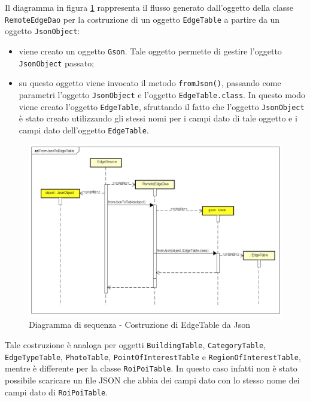 \documentclass[../DefinizioneDiProdotto.tex]{subfiles}
\begin{document}
		Il diagramma in figura \ref{fig:FromJsonToEdgeTable} rappresenta il flusso generato dall'oggetto della classe \verb|RemoteEdgeDao| per la costruzione di un oggetto \verb|EdgeTable| a partire da un oggetto \verb|JsonObject|:
		\begin{itemize}
			\item viene creato un oggetto \verb|Gson|. Tale oggetto permette di gestire l'oggetto \verb|JsonObject| passato;
			\item su questo oggetto viene invocato il metodo \verb|fromJson()|, passando come parametri l'oggetto \verb|JsonObject| e l'oggetto \verb|EdgeTable.class|. In questo modo viene creato l'oggetto \verb|EdgeTable|, sfruttando il fatto che l'oggetto \verb|JsonObject| è stato creato utilizzando gli stessi nomi per i campi dato di tale oggetto e i campi dato dell'oggetto \verb|EdgeTable|.
		\end{itemize}

		\vfill
		\begin{figure} [h]
			\includegraphics[width=\textwidth]{diagrams/FromJsonToEdgeTable}
			\caption{Diagramma di sequenza - Costruzione di EdgeTable da Json}
			\label{fig:FromJsonToEdgeTable}
		\end{figure}

		\vfill	
		
		\newpage		
		
		Tale costruzione è analoga per oggetti \verb|BuildingTable|, \verb|CategoryTable|, \verb|EdgeTypeTable|, \verb|PhotoTable|, \verb|PointOfInterestTable| e \verb|RegionOfInterestTable|, mentre è differente per la classe \verb|RoiPoiTable|. In questo caso infatti non è stato possibile scaricare un file JSON che abbia dei campi dato con lo stesso nome dei campi dato di \verb|RoiPoiTable|. 
		
\end{document}
